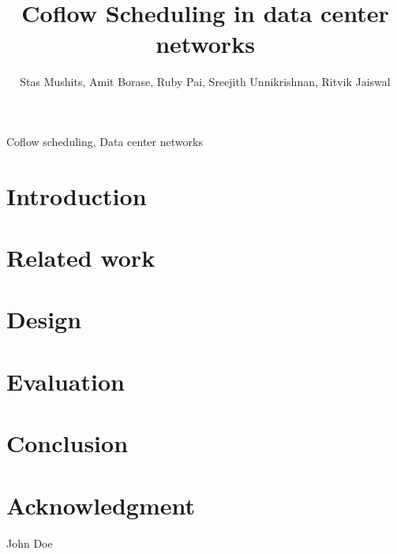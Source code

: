 \documentclass[conference]{IEEEtran}
\title{Coflow Scheduling in data center networks}
\begin{document}
\author{ Stas Mushits, Amit Borase, Ruby Pai, Sreejith Unnikrishnan, Ritvik Jaiswal }

\maketitle


\begin{abstract}
\blindtext[1]
\end{abstract}

\begin{IEEEkeywords}
Coflow scheduling, Data center networks
\end{IEEEkeywords}

\section{Introduction}


\section{Related work}

\section{Design}

\section{Evaluation}

\section{Conclusion}

\section*{Acknowledgment}

\begin{thebibliography}{10}

\end{thebibliography}


\begin{IEEEbiography}{John Doe}
\blindtext
\end{IEEEbiography}
\end{document}
